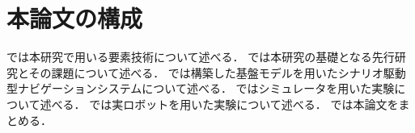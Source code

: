 \section{本論文の構成}
\label{sec:structure}

では本研究で用いる要素技術について述べる．
では本研究の基礎となる先行研究とその課題について述べる．
では構築した基盤モデルを用いたシナリオ駆動型ナビゲーションシステムについて述べる．
ではシミュレータを用いた実験について述べる．
では実ロボットを用いた実験について述べる．
では本論文をまとめる．
